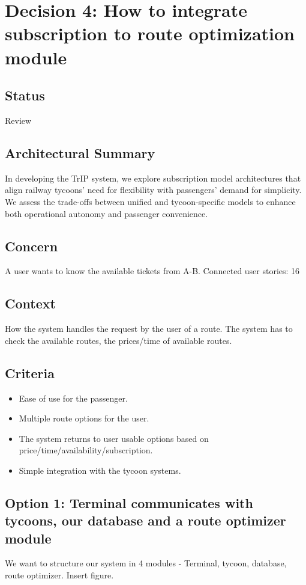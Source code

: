 \section*{Decision 4: How to integrate subscription to route optimization module}

\subsection*{Status}
Review

\subsection*{Architectural Summary}
In developing the TrIP system, we explore subscription model architectures that align railway tycoons' need for flexibility with passengers' demand for simplicity. We assess the trade-offs between unified and tycoon-specific models to enhance both operational autonomy and passenger convenience.

\subsection*{Concern}
A user wants to know the available tickets from A-B. 
Connected user stories: 16

\subsection*{Context}
How the system handles the request by the user of a route. The system has to check the available routes, the prices/time of available routes.

\subsection*{Criteria}
\begin{itemize}
\item Ease of use for the passenger.
\item Multiple route options for the user.
\item The system returns to user usable options based on price/time/availability/subscription.
\item Simple integration with the tycoon systems.
\end{itemize}

\subsection*{Option 1: Terminal communicates with tycoons, our database and a route optimizer module}
We want to structure our system in 4 modules - Terminal, tycoon, database, route optimizer.
Insert figure.


